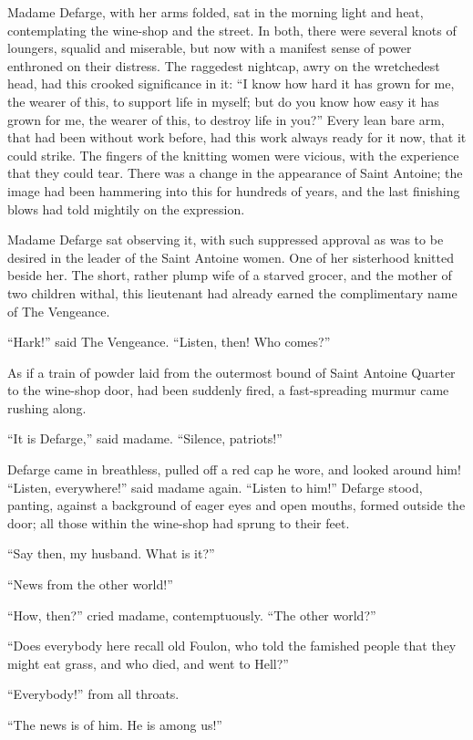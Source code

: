 Madame Defarge, with her arms folded, sat in the morning light and heat,
contemplating the wine-shop and the street.  In both, there were several
knots of loungers, squalid and miserable, but now with a manifest sense
of power enthroned on their distress.  The raggedest nightcap, awry on
the wretchedest head, had this crooked significance in it:  ``I know how
hard it has grown for me, the wearer of this, to support life in myself;
but do you know how easy it has grown for me, the wearer of this, to
destroy life in you?''  Every lean bare arm, that had been without work
before, had this work always ready for it now, that it could strike.
The fingers of the knitting women were vicious, with the experience that
they could tear.  There was a change in the appearance of Saint Antoine;
the image had been hammering into this for hundreds of years, and the
last finishing blows had told mightily on the expression.

Madame Defarge sat observing it, with such suppressed approval as was
to be desired in the leader of the Saint Antoine women.  One of her
sisterhood knitted beside her.  The short, rather plump wife of a
starved grocer, and the mother of two children withal, this lieutenant
had already earned the complimentary name of The Vengeance.

``Hark!'' said The Vengeance.  ``Listen, then!  Who comes?''

As if a train of powder laid from the outermost bound of Saint Antoine
Quarter to the wine-shop door, had been suddenly fired, a fast-spreading
murmur came rushing along.

``It is Defarge,'' said madame.  ``Silence, patriots!''

Defarge came in breathless, pulled off a red cap he wore, and looked
around him!  ``Listen, everywhere!'' said madame again.  ``Listen to him!''
Defarge stood, panting, against a background of eager eyes and open
mouths, formed outside the door; all those within the wine-shop had
sprung to their feet.

``Say then, my husband.  What is it?''

``News from the other world!''

``How, then?'' cried madame, contemptuously.  ``The other world?''

``Does everybody here recall old Foulon, who told the famished people
that they might eat grass, and who died, and went to Hell?''

``Everybody!'' from all throats.

``The news is of him.  He is among us!''

